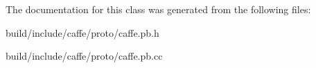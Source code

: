 The documentation for this class was generated from the following files\+:\begin{DoxyCompactItemize}
\item 
build/include/caffe/proto/caffe.\+pb.\+h\item 
build/include/caffe/proto/caffe.\+pb.\+cc\end{DoxyCompactItemize}
